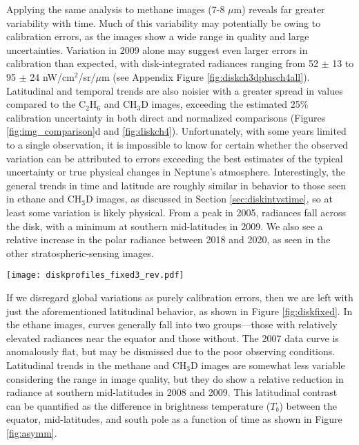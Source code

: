 \documentclass[twocolumn,10pt]{aastex631}
\begin{document}
Applying the same analysis to methane images (7-8 $\mu$m) reveals far greater variability with time. Much of this variability may potentially be owing to calibration errors, as the images show a wide range in quality and large uncertainties.  Variation in 2009 alone may suggest even larger errors in calibration than expected, with disk-integrated radiances ranging from 52 $\pm$ 13 to 95 $\pm$ 24 nW/cm$^2$/sr/$\mu$m (see Appendix Figure \ref{fig:diskch3dplusch4all}). Latitudinal and temporal trends are also noisier with a greater spread in values compared to the C$_2$H$_6$ and CH$_3$D images, exceeding the estimated 25\% calibration uncertainty in both direct and normalized comparisons (Figures \ref{fig:img_comparison}d and \ref{fig:diskch4}). Unfortunately, with some years limited to a single observation, it is impossible to know for certain whether the observed variation can be attributed to errors exceeding the best estimates of the typical uncertainty or true physical changes in Neptune's atmosphere. Interestingly, the general trends in time and latitude are roughly similar in behavior to those seen in ethane and CH$_3$D images, as discussed in Section \ref{sec:diskintvstime}, so at least some variation is likely physical. From a peak in 2005, radiances fall across the disk, with a minimum at southern mid-latitudes in 2009.  We also see a relative increase in the polar radiance between 2018 and 2020, as seen in the other stratospheric-sensing images.  

\begin{figure*}
   \centering
   \texttt{[image: diskprofiles\_fixed3\_rev.pdf]}
    \caption{Annually averaged meridional variation in radiance, normalized and arbitrarily adjusted in magnitude to reduce offsets and emphasize meridional trends for C$_2$H$_6$ (left), CH$_3$D (center), and CH$_4$ (right). For comparison, curves are shifted so that the northern limbs---the least variable region in the relatively reliable ethane images---are nearly invariant in radiance.}
    \label{fig:diskfixed}
\end{figure*}

If we disregard global variations as purely calibration errors, then we are left with just the aforementioned latitudinal behavior, as shown in Figure \ref{fig:diskfixed}.  In the ethane images, curves generally fall into two groups---those with relatively elevated radiances near the equator and those without. The 2007 data curve is anomalously flat, but may be dismissed due to the poor observing conditions.  Latitudinal trends in the methane and CH$_3$D images are somewhat less variable considering the range in image quality, but they do show a relative reduction in radiance at southern mid-latitudes in 2008 and 2009.  This latitudinal contrast can be quantified as the difference in brightness temperature ($T_b$) between the equator, mid-latitudes, and south pole as a function of time as shown in Figure \ref{fig:asymm}.
\end{document}
